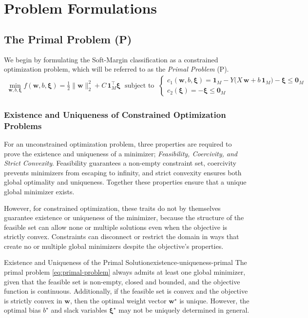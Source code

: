 \section{Problem Formulations}\label{chap:problem}
\vspace{-0.4cm}
\subsection{The Primal Problem (P)} %
We begin by formulating the Soft-Margin classification as a constrained optimization problem, 
which will be referred to as the \emph{Primal Problem} (P).
\begin{align*}\label{eq:primal-problem}
	\min_{\symbf{w}, b, \symbf{\xi}} f(\symbf{w}, b, \symbf{\xi}) = \frac{1}{2}\|\symbf{w}\|_2^2 + C\,\symbf{1}_M^\top \symbf{\xi}
	\;
	\text{ subject to } 
	\;
	\begin{cases}
		c_1(\symbf{w}, b, \symbf{\xi}) = \symbf{1}_M - Y\bigl(X\,\symbf{w} + b\,\symbf{1}_M\bigr) - \symbf{\xi}  \le \symbf{0}_M \\
		c_2(\symbf{\xi}) = -\symbf{\xi} \leq \symbf{0}_M
	\end{cases}\tag{P}
\end{align*}
\subsubsection{Existence and Uniqueness of Constrained Optimization Problems}
For an unconstrained optimization problem, three properties are required to prove the existence
and uniqueness of a minimizer; \emph{Feasibility, Coercivity, and Strict Convexity}.
Feasibility guarantees a non-empty constraint set, coercivity prevents minimizers from
escaping to infinity, and strict convexity ensures both global optimality and uniqueness.
Together these properties ensure that a unique global minimizer exists.

However, for constrained optimization, these traits do not by themselves guarantee existence or
uniqueness of the minimizer, because the structure of the feasible set can allow none or
multiple solutions even when the objective is strictly convex. Constraints can disconnect or
restrict the domain in ways that create no or multiple global minimizers despite the objective's
properties.

\begin{theorem}{Existence and Uniqueness of the Primal Solution}{existence-uniqueness-primal}
	The primal problem \eqref{eq:primal-problem} always admits at least one global minimizer,
	given that the feasible set is non-empty, closed and bounded, and the objective function is continuous.
	Additionally, if the feasible set is convex and the objective is strictly convex in $\symbf{w}$,
	then the optimal weight vector $\symbf{w}^\star$ is unique. However, the optimal bias $b^\star$
	and slack variables $\symbf{\xi}^\star$ may not be uniquely determined in general.
\end{theorem}


